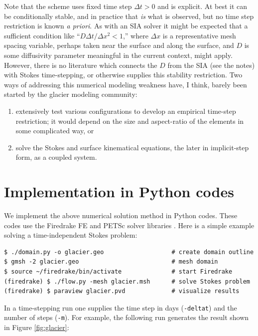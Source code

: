 \documentclass[letterpaper,final,12pt,reqno]{amsart}
\begin{document}
Note that the scheme uses fixed time step $\Delta t > 0$ and is explicit.  At best it can be conditionally stable, and in practice that \emph{is} what is observed, but no time step restriction is known \emph{a priori}.  As with an SIA solver it might be expected that a sufficient condition like ``$D\Delta t / \Delta x^2 < 1$,'' where $\Delta x$ is a representative mesh spacing variable, perhaps taken near the surface and along the surface, and $D$ is some diffusivity parameter meaningful in the current context, might apply.  However, there is no literature which connects the $D$ from the SIA (see the notes) with Stokes time-stepping, or otherwise supplies this stability restriction.  Two ways of addressing this numerical modeling weakness have, I think, barely been started by the glacier modeling community:
\renewcommand{\labelenumi}{(\roman{enumi})}
\begin{enumerate}
\item extensively test various configurations to develop an empirical time-step restriction; it would depend on the size and aspect-ratio of the elements in some complicated way, or
\item solve the Stokes and surface kinematical equations, the later in implicit-step form, as a coupled system.
\end{enumerate}


\section{Implementation in Python codes} \label{sec:implementation}

We implement the above numerical solution method in Python codes.  These codes use the Firedrake FE \cite{Rathgeberetal2016} and PETSc solver libraries \cite{Balayetal2018,Bueler2021}.  Here is a simple example solving a time-independent Stokes problem:

\medskip
\begin{Verbatim}
$ ./domain.py -o glacier.geo                   # create domain outline
$ gmsh -2 glacier.geo                          # mesh domain
$ source ~/firedrake/bin/activate              # start Firedrake
(firedrake) $ ./flow.py -mesh glacier.msh      # solve Stokes problem
(firedrake) $ paraview glacier.pvd             # visualize results
\end{Verbatim}

\medskip
\noindent In a time-stepping run one supplies the time step in days (\texttt{-deltat}) and the number of steps (\texttt{-m}).  For example, the following run generates the result shown in Figure \ref{fig:glacier}:
\end{document}
